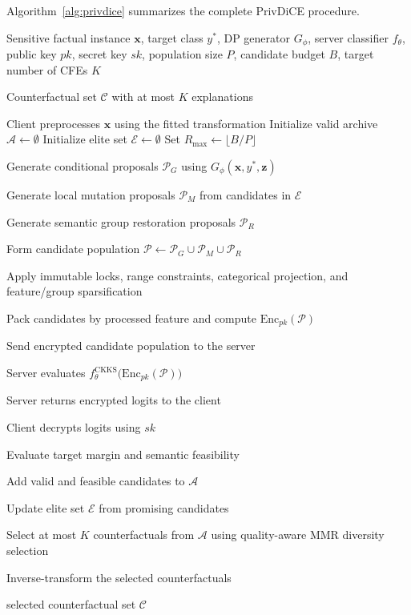 \documentclass[preprint,12pt]{elsarticle}
\begin{document}
Algorithm~\ref{alg:privdice} summarizes the complete PrivDiCE procedure.

\begin{algorithm}[!ht]
\caption{PrivDiCE Privacy-Preserving Counterfactual Generation}
\label{alg:privdice}
\begin{algorithmic}[1]

\Require Sensitive factual instance $\mathbf{x}$, target class $y^{*}$,
DP generator $G_{\phi}$, server classifier $f_{\theta}$,
public key $pk$, secret key $sk$, population size $P$,
candidate budget $B$, target number of CFEs $K$

\Ensure Counterfactual set $\mathcal{C}$ with at most $K$ explanations

\State Client preprocesses $\mathbf{x}$ using the fitted transformation
\State Initialize valid archive $\mathcal{A} \leftarrow \emptyset$
\State Initialize elite set $\mathcal{E} \leftarrow \emptyset$
\State Set $R_{\max} \leftarrow \lfloor B/P \rfloor$


    \State Generate conditional proposals
    $\mathcal{P}_{G}$ using $G_{\phi}(\mathbf{x},y^{*},\mathbf{z})$

    \State Generate local mutation proposals
    $\mathcal{P}_{M}$ from candidates in $\mathcal{E}$

    \State Generate semantic group restoration proposals
    $\mathcal{P}_{R}$

    \State Form candidate population
    $\mathcal{P} \leftarrow
    \mathcal{P}_{G} \cup \mathcal{P}_{M} \cup \mathcal{P}_{R}$

    \State Apply immutable locks, range constraints,
    categorical projection, and feature/group sparsification

    \State Pack candidates by processed feature and compute
    $\mathrm{Enc}_{pk}(\mathcal{P})$

    \State Send encrypted candidate population to the server

    \State Server evaluates
    $f_{\theta}^{\mathrm{CKKS}}
    \bigl(\mathrm{Enc}_{pk}(\mathcal{P})\bigr)$

    \State Server returns encrypted logits to the client

    \State Client decrypts logits using $sk$

    \State Evaluate target margin and semantic feasibility

    \State Add valid and feasible candidates to $\mathcal{A}$

    \State Update elite set $\mathcal{E}$ from promising candidates

\EndFor

\State Select at most $K$ counterfactuals from $\mathcal{A}$
using quality-aware MMR diversity selection

\State Inverse-transform the selected counterfactuals

\State \Return selected counterfactual set $\mathcal{C}$

\end{algorithmic}
\end{algorithm}
\end{document}
